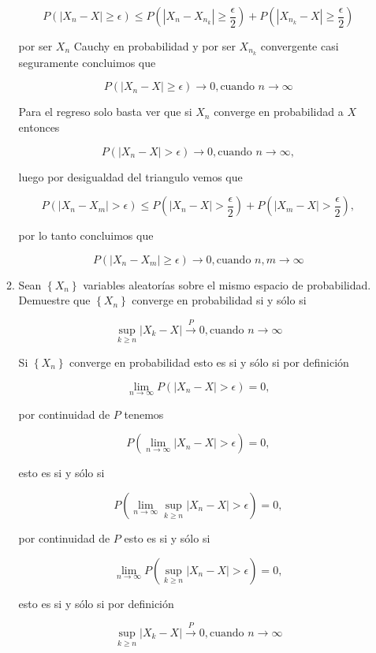 \documentclass[letterpaper]{article}
\newcommand{\limninf}{\lim_{n\to\infty}}
\newcommand{\abs}[1]{\left| #1 \right| }
\newcommand{\pars}[1]{\left( #1 \right) }
\newcommand{\set}[1]{\left \{ #1 \right\} }
\newcommand{\1}{\mathbbm{1}}
\begin{document}
\begin{enumerate}
\begin{enumerate}
			\[P\pars{\abs{X_n-X}\geq\epsilon} \leq P\pars{\abs{X_n-X_{n_k}}\geq\frac{\epsilon}{2}} + P\pars{\abs{X_{n_k}-X}\geq\frac{\epsilon}{2}}\]

			por ser $X_n$ Cauchy en probabilidad y por ser $X_{n_k}$ convergente casi seguramente concluimos que

			\[P\pars{\abs{X_n-X}\geq\epsilon} \rightarrow 0, \text{cuando }n\rightarrow\infty\]

			Para el regreso solo basta ver que si $X_n$ converge en probabilidad a $X$ entonces

			\[P\pars{\abs{X_n-X}>\epsilon}\rightarrow 0, \text{cuando } n\rightarrow\infty,\]

			luego por desigualdad del triangulo vemos que

			\[P\pars{\abs{X_n-X_m}>\epsilon}\leq P\pars{\abs{X_n-X}>\frac{\epsilon}{2}} + P\pars{\abs{X_m-X}>\frac{\epsilon}{2}},\]

			por lo tanto concluimos que

			\[P\pars{\abs{X_n-X_m}\geq\epsilon} \rightarrow 0, \text{cuando }n,m\rightarrow\infty\]

			\item Sean $\set{X_n}$ variables aleatorías sobre el mismo espacio de probabilidad. Demuestre que $\set{X_n}$ converge en probabilidad si y sólo si
			
			\[\sup_{k\geq n}|X_k-X|\xrightarrow{P}0, \text{cuando } n\rightarrow\infty\]

			Si $\set{X_n}$ converge en probabilidad esto es si y sólo si por definición

			\[\limninf P\pars{\abs{X_n-X}>\epsilon} = 0,\]

			por continuidad de $P$ tenemos

			\[P\pars{\limninf\abs{X_n-X}>\epsilon} = 0,\]

			esto es si y sólo si

			\[P\pars{\limninf \sup_{k\geq n}\abs{X_n-X}>\epsilon} = 0,\]

			por continuidad de $P$ esto es si y sólo si

			\[\limninf P\pars{\sup_{k\geq n}\abs{X_n-X}>\epsilon} = 0,\]

			esto es si y sólo si por definición

			\[\sup_{k\geq n}|X_k-X|\xrightarrow{P}0, \text{cuando } n\rightarrow\infty\]
			

		\end{enumerate}

    \end{enumerate}

	
\end{document}
